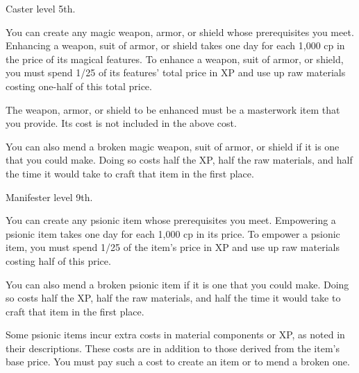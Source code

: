 


{Caster level 5th.}
{You can create any magic weapon, armor, or shield whose prerequisites you meet. Enhancing a weapon, suit of armor, or shield takes one day for each 1,000 cp in the price of its magical features. To enhance a weapon, suit of armor, or shield, you must spend 1/25 of its features' total price in XP and use up raw materials costing one-half of this total price.

The weapon, armor, or shield to be enhanced must be a masterwork item that you provide. Its cost is not included in the above cost.

You can also mend a broken magic weapon, suit of armor, or shield if it is one that you could make. Doing so costs half the XP, half the raw materials, and half the time it would take to craft that item in the first place.}

{Manifester level 9th.}
{You can create any psionic item whose prerequisites you meet. Empowering a psionic item takes one day for each 1,000 cp in its price. To empower a psionic item, you must spend 1/25 of the item's price in XP and use up raw materials costing half of this price.

You can also mend a broken psionic item if it is one that you could make. Doing so costs half the XP, half the raw materials, and half the time it would take to craft that item in the first place.

Some psionic items incur extra costs in material components or XP, as noted in their descriptions. These costs are in addition to those derived from the item's base price. You must pay such a cost to create an item or to mend a broken one.}

